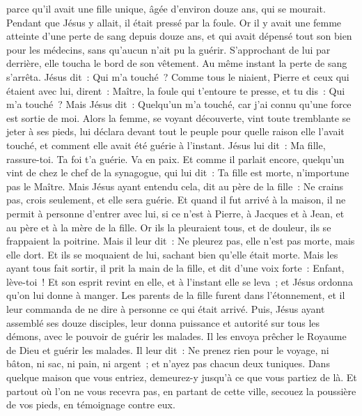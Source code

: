\begin{multicols}{2}
parce qu'il avait une fille unique, âgée d'environ douze ans, qui se mourait. Pendant que Jésus y allait, il était pressé par la foule.
Or il y avait une femme atteinte d'une perte de sang depuis douze ans, et qui avait dépensé tout son bien pour les médecins, sans qu'aucun n'ait pu la guérir.
S'approchant de lui par derrière, elle toucha le bord de son vêtement. Au même instant la perte de sang s'arrêta.
Jésus dit~: Qui m'a touché~? Comme tous le niaient, Pierre et ceux qui étaient avec lui, dirent~: Maître, la foule qui t'entoure te presse, et tu dis~: Qui m'a touché~?
Mais Jésus dit~: Quelqu'un m'a touché, car j'ai connu qu'une force est sortie de moi.
Alors la femme, se voyant découverte, vint toute tremblante se jeter à ses pieds, lui déclara devant tout le peuple pour quelle raison elle l'avait touché, et comment elle avait été guérie à l'instant.
Jésus lui dit~: Ma fille, rassure-toi. Ta foi t'a guérie. Va en paix.
Et comme il parlait encore, quelqu'un vint de chez le chef de la synagogue, qui lui dit~: Ta fille est morte, n'importune pas le Maître.
Mais Jésus ayant entendu cela, dit au père de la fille~: Ne crains pas, crois seulement, et elle sera guérie.
Et quand il fut arrivé à la maison, il ne permit à personne d'entrer avec lui, si ce n'est à Pierre, à Jacques et à Jean, et au père et à la mère de la fille.
Or ils la pleuraient tous, et de douleur, ils se frappaient la poitrine. Mais il leur dit~: Ne pleurez pas, elle n'est pas morte, mais elle dort.
Et ils se moquaient de lui, sachant bien qu'elle était morte.
Mais les ayant tous fait sortir, il prit la main de la fille, et dit d'une voix forte~: Enfant, lève-toi~!
Et son esprit revint en elle, et à l'instant elle se leva~; et Jésus ordonna qu'on lui donne à manger.
Les parents de la fille furent dans l'étonnement, et il leur commanda de ne dire à personne ce qui était arrivé.
\VerseOne{}Puis, Jésus ayant assemblé ses douze disciples, leur donna puissance et autorité sur tous les démons, avec le pouvoir de guérir les malades.
Il les envoya prêcher le Royaume de Dieu et guérir les malades.
Il leur dit~: Ne prenez rien pour le voyage, ni bâton, ni sac, ni pain, ni argent~; et n'ayez pas chacun deux tuniques.
Dans quelque maison que vous entriez, demeurez-y jusqu'à ce que vous partiez de là.
Et partout où l'on ne vous recevra pas, en partant de cette ville, secouez la poussière de vos pieds, en témoignage contre eux.

\end{multicols}
